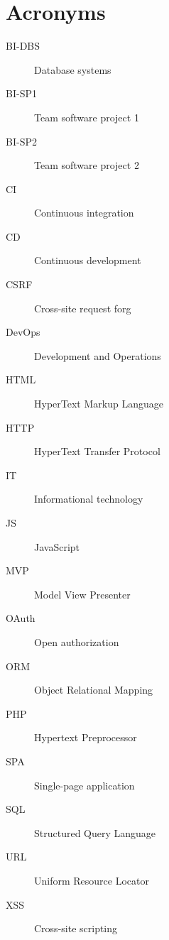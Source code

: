 \chapter{Acronyms}
\begin{description}
    \item[BI-DBS] Database systems
    \item[BI-SP1] Team software project 1
    \item[BI-SP2] Team software project 2
    \item[CI] Continuous integration
    \item[CD] Continuous development
    \item[CSRF] Cross-site request forg
    \item[DevOps] Development and Operations
    \item[HTML] HyperText Markup Language
    \item[HTTP] HyperText Transfer Protocol
    \item[IT] Informational technology
    \item[JS] JavaScript
    \item[MVP] Model View Presenter
    \item[OAuth] Open authorization
    \item[ORM] Object Relational Mapping
    \item[PHP] Hypertext Preprocessor
    \item[SPA] Single-page application
    \item[SQL] Structured Query Language
    \item[URL] Uniform Resource Locator 
    \item[XSS] Cross-site scripting
\end{description}

